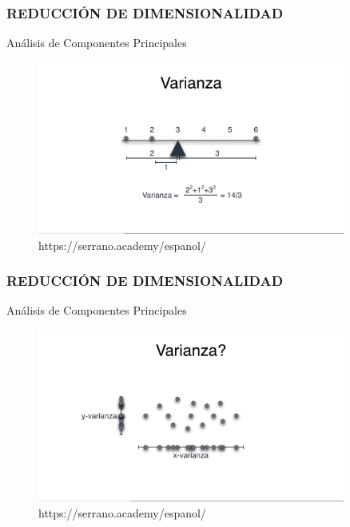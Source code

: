 \documentclass{beamer}
\begin{document}
\begin{frame}
	\frametitle{REDUCCIÓN DE DIMENSIONALIDAD}
	\begin{block}{Análisis de Componentes Principales}	
		\begin{figure}
			\includegraphics[width=0.9\textwidth]{PCA/IMG_3549.jpg}
			\caption{https://serrano.academy/espanol/}
		\end{figure}
	\end{block}
\end{frame}


\begin{frame}
	\frametitle{REDUCCIÓN DE DIMENSIONALIDAD}
	\begin{block}{Análisis de Componentes Principales}	
		\begin{figure}
			\includegraphics[width=0.9\textwidth]{PCA/IMG_3550.jpg}
			\caption{https://serrano.academy/espanol/}
		\end{figure}
	\end{block}
\end{frame}
\end{document}
